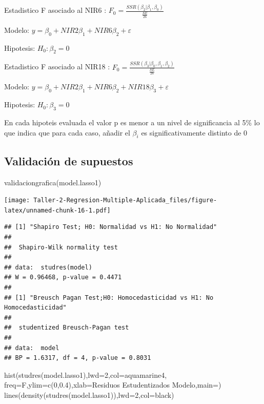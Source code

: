 \documentclass[
]{article}
\newenvironment{Shaded}{\begin{snugshade}}{\end{snugshade}}
\newcommand{\AttributeTok}[1]{\textcolor[rgb]{0.77,0.63,0.00}{#1}}
\newcommand{\DecValTok}[1]{\textcolor[rgb]{0.00,0.00,0.81}{#1}}
\newcommand{\FloatTok}[1]{\textcolor[rgb]{0.00,0.00,0.81}{#1}}
\newcommand{\FunctionTok}[1]{\textcolor[rgb]{0.00,0.00,0.00}{#1}}
\newcommand{\NormalTok}[1]{#1}
\newcommand{\StringTok}[1]{\textcolor[rgb]{0.31,0.60,0.02}{#1}}
\begin{document}
Estadistico F asociado al NIR6 :
\(F_0 = \frac{{SSR(\beta_2|\beta_1,\beta_0)}}{\frac{SE}{26}}\)

Modelo: \(y =\beta_0+NIR2\beta_1+NIR6\beta_2+\varepsilon\)

Hipotesis: \(H_0: \beta_2=0\)

Estadistico F asociado al NIR18 :
\(F_0 = \frac{{SSR(\beta_3|\beta_0,\beta_1,\beta_2)}}{\frac{SE}{26}}\)

Modelo: \(y =\beta_0+NIR2\beta_1+NIR6\beta_2+NIR18\beta_3+\varepsilon\)

Hipotesis: \(H_0: \beta_3=0\)

En cada hipoteis evaluada el valor p es menor a un nivel de
significancia al 5\% lo que indica que para cada caso, añadir el
\(\beta_i\) es significativamente distinto de 0

\hypertarget{validaciuxf3n-de-supuestos}{%
\subsection{Validación de supuestos}\label{validaciuxf3n-de-supuestos}}

\begin{Shaded}
\begin{Highlighting}[]
\FunctionTok{validaciongrafica}\NormalTok{(model.lasso1)}
\end{Highlighting}
\end{Shaded}

\texttt{[image: Taller-2-Regresion-Multiple-Aplicada\_files/figure-latex/unnamed-chunk-16-1.pdf]}

\begin{verbatim}
## [1] "Shapiro Test; H0: Normalidad vs H1: No Normalidad"
## 
##  Shapiro-Wilk normality test
## 
## data:  studres(model)
## W = 0.96468, p-value = 0.4471
## 
## [1] "Breusch Pagan Test;H0: Homocedasticidad vs H1: No Homocedasticidad"
## 
##  studentized Breusch-Pagan test
## 
## data:  model
## BP = 1.6317, df = 4, p-value = 0.8031
\end{verbatim}

\begin{Shaded}
\begin{Highlighting}[]
\FunctionTok{hist}\NormalTok{(}\FunctionTok{studres}\NormalTok{(model.lasso1),}\AttributeTok{lwd=}\DecValTok{2}\NormalTok{,}\AttributeTok{col=}\StringTok{\textquotesingle{}aquamarine4\textquotesingle{}}\NormalTok{,}
\AttributeTok{freq=}\NormalTok{F,}\AttributeTok{ylim=}\FunctionTok{c}\NormalTok{(}\DecValTok{0}\NormalTok{,}\FloatTok{0.4}\NormalTok{),}\AttributeTok{xlab=}\StringTok{\textquotesingle{}Residuos Estudentizados Modelo\textquotesingle{}}\NormalTok{,}\AttributeTok{main=}\StringTok{\textquotesingle{}\textquotesingle{}}\NormalTok{)}
\FunctionTok{lines}\NormalTok{(}\FunctionTok{density}\NormalTok{(}\FunctionTok{studres}\NormalTok{(model.lasso1)),}\AttributeTok{lwd=}\DecValTok{2}\NormalTok{,}\AttributeTok{col=}\StringTok{\textquotesingle{}black\textquotesingle{}}\NormalTok{)}
\end{Highlighting}
\end{Shaded}
\end{document}
